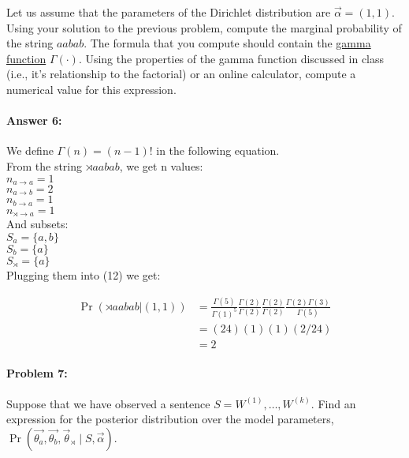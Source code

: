 \documentclass[10pt]{article}
\begin{document}
Let us assume that the parameters of the Dirichlet distribution are
$\vec{\alpha} = (1,1)$. Using your solution to the previous problem,
compute the marginal probability of the string $aabab$. The formula
that you compute should contain the
\href{https://en.wikipedia.org/wiki/Gamma_function}{gamma function}
$\Gamma(\cdot)$. Using the properties of the gamma function discussed
in class (i.e., it's relationship to the factorial) or an online
calculator, compute a numerical value for this expression.


\paragraph{Answer 6:} We define $\Gamma(n) = (n-1)!$ in the following equation. 
\\
From the string $\rtimes aabab$, we get n values:\\
$n_{a \rightarrow a} = 1$\\
$n_{a \rightarrow b} = 2$\\
$n_{b \rightarrow a} = 1$\\
$n_{\rtimes \rightarrow a} = 1$\\

And subsets:\\
$S_a = {\{a, b\}}$\\
$S_b = \{{a\}}$\\
$S_\rtimes = {\{a\}}$\\

Plugging them into (12) we get:

\begin{equation*}
\begin{aligned}
\Pr(\rtimes aabab|(1,1))&={\frac{\Gamma(5)}{\Gamma(1)^5}}
 {\frac{\Gamma(2)}{\Gamma \left(2\right)}} 
{\frac{\Gamma(2)}{\Gamma(2)}}
{\frac{\Gamma(2)\Gamma(3)}{\Gamma(5)}}
\\
 &= (24)(1)(1)(2/24)\\
 &= 2
\end{aligned}
\end{equation*}

\hrulefill
\paragraph{Problem 7:}

Suppose that we have observed a sentence
$S=W^{(1)},\dots,W^{(k)}$. Find an expression for the posterior
distribution over the model parameters,
$\Pr(\vec{\theta_a}, \vec{\theta_b}, \vec{\theta}_{\rtimes} \mid S,
\vec{\alpha})$.\\
\end{document}
